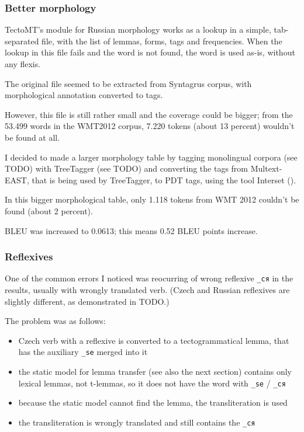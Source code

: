 

\subsubsection{Better morphology}
TectoMT's module for Russian morphology works as a lookup in a simple, tab-separated file, with the list of lemmas, forms, tags and frequencies. When the lookup in this file fails and the word is not found, the word is used as-is, without any flexis.

The original file seemed to be extracted from Syntagrus corpus, with morphological annotation converted to  tags.

However, this file is still rather small and the coverage could be bigger; from the 53.499 words in the WMT2012 corpus, 7.220 tokens (about 13 percent) wouldn't be found at all.

I decided to made a larger morphology table by tagging monolingual corpora (see TODO) with TreeTagger (see TODO) and converting the tags from Multext-EAST, that is being used by TreeTagger, to PDT tags, using the tool Interset (\cite{interset}).

In this bigger morphological table, only 1.118 tokens from WMT 2012 couldn't be found (about 2 percent). 

BLEU was increased to 0.0613; this means 0.52 BLEU points increase.

\subsubsection{Reflexives}
One of the common errors I noticed was reocurring of wrong reflexive \texttt{\_ся} in the results, usually with wrongly translated verb. (Czech and Russian reflexives are slightly different, as demonstrated in TODO.)

The problem was as follows:
\begin{itemize}
\item Czech verb with a reflexive is converted to a tectogrammatical lemma, that has the auxiliary \texttt{\_se} merged into it
\item the static model for lemma transfer (see also the next section) contains only lexical lemmas, not t-lemmas, so it does not have the word with \texttt{\_se} / \texttt{\_ся}
\item because the static model cannot find the lemma, the transliteration is used
\item the transliteration is wrongly translated and still contains the \texttt{\_ся}
\end{itemize}

